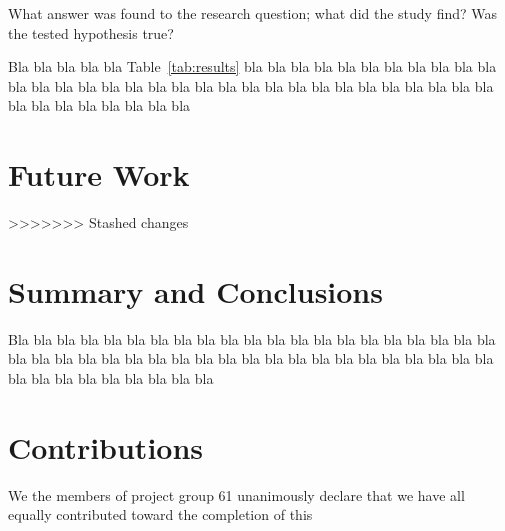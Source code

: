 \documentclass[a4paper,12pt]{article}
\begin{document}
What answer was found to the research question; what did the study find? Was the tested hypothesis true?

Bla bla bla bla bla Table~\ref{tab:results} bla bla bla bla bla bla
bla bla bla bla bla bla bla bla bla bla bla bla bla bla bla bla bla
bla bla bla bla bla bla bla bla bla bla bla bla bla bla bla bla bla
\section{Future Work}
\label{sec:future}
>>>>>>> Stashed changes
\section{Summary and Conclusions}
\label{sec:summary}

Bla bla bla bla bla bla bla bla bla bla bla bla bla bla bla bla bla
bla bla bla bla bla bla bla bla bla bla bla bla bla bla bla bla bla
bla bla bla bla bla bla bla bla bla bla bla bla bla bla bla bla bla

\section{Contributions}
\label{sec:contributions}
We the members of project group 61 unanimously declare that
we have all equally contributed toward the completion of this


\end{document}
